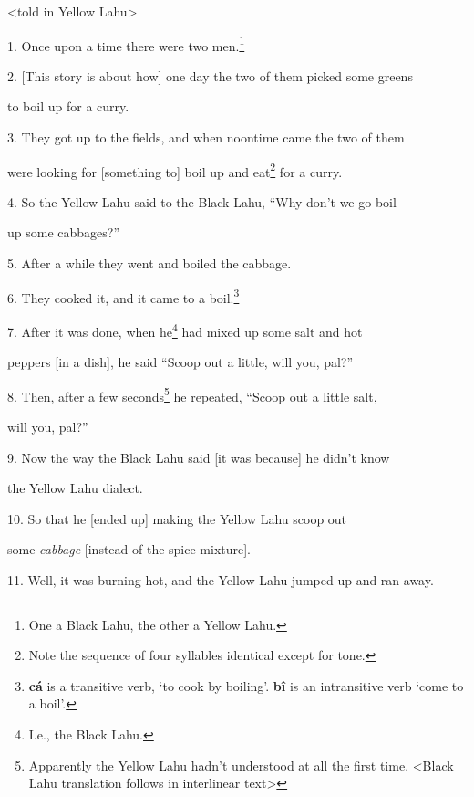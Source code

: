 \setcounter{footnote}{0}

<told in Yellow Lahu>

1. Once upon a time there were two men.\footnote{One a Black Lahu, the other a Yellow Lahu.}

2. [This story is about how] one day the two of them picked some greens

to boil up for a curry.

3. They got up to the fields, and when noontime came the two of them

were looking for [something to] boil up and eat\footnote{Note the sequence of four syllables identical except for tone.} for a curry.

4. So the Yellow Lahu said to the Black Lahu, ``Why don't we go boil

up some cabbages?''

5. After a while they went and boiled the cabbage.

6. They cooked it, and it came to a boil.\footnote{\textbf{cá} is a transitive verb, `to cook by boiling'. \textbf{bî} is an intransitive verb `come to a boil'.}

7. After it was done, when he\footnote{I.e., the Black Lahu.} had mixed up some salt and hot

peppers [in a dish], he said ``Scoop out a little, will you, pal?''

8. Then, after a few seconds\footnote{Apparently the Yellow Lahu hadn't understood at all the first time. <Black Lahu translation follows in interlinear text>} he repeated, ``Scoop out a little salt,

will you, pal?''

9. Now the way the Black Lahu said [it was because] he didn't know

the Yellow Lahu dialect.

10. So that he [ended up] making the Yellow Lahu scoop out

some \textit{cabbage} [instead of the spice mixture].

11. Well, it was burning hot, and the Yellow Lahu jumped up and ran away.

